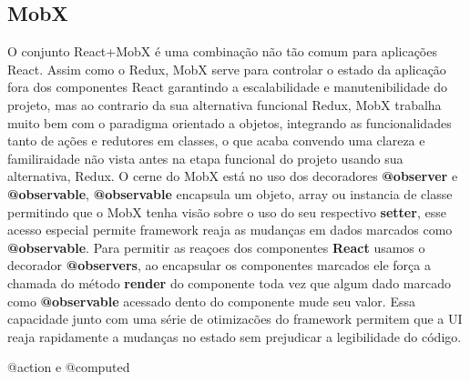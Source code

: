 \documentclass[rel_mlp]{iiufrgs}
\begin{document}
\subsection{MobX}
O conjunto React+MobX é uma combinação não tão comum para aplicações React. Assim como o Redux, MobX serve para controlar o estado da aplicação fora dos componentes React garantindo a escalabilidade e manutenibilidade
 do projeto, mas ao contrario da sua alternativa funcional Redux, MobX trabalha muito bem com o paradigma orientado a objetos, integrando as funcionalidades tanto de ações e redutores em classes, o que acaba convendo uma clareza
 e familiraidade não vista antes na etapa funcional do projeto usando sua alternativa, Redux. O cerne do MobX está no uso dos decoradores \textbf{@observer} e \textbf{@observable}, \textbf{@observable} encapsula um objeto, array ou instancia de classe 
  permitindo que o MobX tenha visão sobre o uso do seu respectivo \textbf{setter}, esse acesso especial permite framework reaja as mudanças em dados marcados como \textbf{@observable}. Para permitir as reaçoes dos componentes \textbf{React}
   usamos o decorador \textbf{@observers}, ao encapsular os componentes marcados ele força a chamada do método \textbf{render} do componente toda vez que algum dado marcado como \textbf{@observable} acessado dento do componente mude seu valor.
    Essa capacidade junto com uma série de otimizacões do framework permitem que a UI reaja rapidamente a mudanças no estado sem prejudicar a legibilidade do código.

    \par {@action e @computed}
\end{document}

